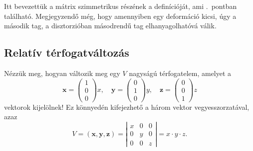 \documentclass[12pt,a4paper]{scrartcl}
\let\mathbf\bm
\begin{document}
Itt bevezettük a mátrix szimmetrikus részének a definícióját, ami .\ pontban található. Megjegyzendő még, hogy amennyiben egy deformáció kicsi, úgy a második tag, a disztorzióban másodrendű tag elhanyagolhatóvá válik.

\subsection{Relatív térfogatváltozás}
Nézzük meg, hogyan változik meg egy $V$ nagyságú térfogatelem, amelyet a
\[{\mathbf{x}} = \left( {\begin{array}{*{20}{c}}
  1 \\ 
  0 \\ 
  0 
\end{array}} \right)x,\quad {\mathbf{y}} = \left( {\begin{array}{*{20}{c}}
  0 \\ 
  1 \\ 
  0 
\end{array}} \right)y,\quad {\mathbf{z}} = \left( {\begin{array}{*{20}{c}}
  0 \\ 
  0 \\ 
  1 
\end{array}} \right)z\]
vektorok kijelölnek! Ez könnyedén kifejezhető a három vektor vegyesszorzatával, azaz
\[V = \left( {{\mathbf{x}},{\mathbf{y}},{\mathbf{z}}} \right) = \left| {\begin{array}{*{20}{c}}
  x&0&0 \\ 
  0&y&0 \\ 
  0&0&z 
\end{array}} \right| = x \cdot y \cdot z.\]
\end{document}
